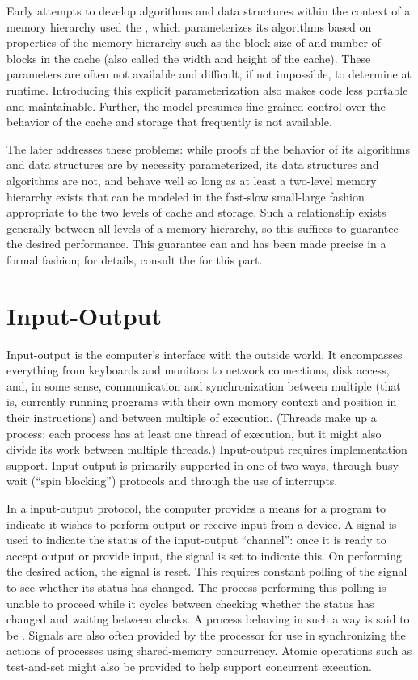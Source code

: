 Early attempts to develop algorithms and data structures within the context of a memory hierarchy used the , which parameterizes its algorithms based on properties of the memory hierarchy such as the block size of and number of blocks in the cache (also called the width and height of the cache). These parameters are often not available and difficult, if not impossible, to determine at runtime. Introducing this explicit parameterization also makes code less portable and maintainable. Further, the model presumes fine-grained control over the behavior of the cache and storage that frequently is not available.

The later  addresses these problems: while proofs of the behavior of its algorithms and data structures are by necessity parameterized, its data structures and algorithms are not, and behave well so long as at least a two-level memory hierarchy exists that can be modeled in the fast-slow small-large fashion appropriate to the two levels of cache and storage. Such a relationship exists generally between all levels of a memory hierarchy, so this suffices to guarantee the desired performance. This guarantee can and has been made precise in a formal fashion; for details, consult the  for this part.

\section{Input-Output}\label{background:computers:inputoutput}
Input-output is the computer's interface with the outside world. It encompasses everything from keyboards and monitors to network connections, disk access, and, in some sense, communication and synchronization between multiple  (that is, currently running programs with their own memory context and position in their instructions) and between multiple  of execution. (Threads make up a process: each process has at least one thread of execution, but it might also divide its work between multiple threads.) Input-output requires implementation support. Input-output is primarily supported in one of two ways, through busy-wait (``spin blocking'') protocols and through the use of interrupts.

In a  input-output protocol, the computer provides a means for a program to indicate it wishes to perform output or receive input from a device. A signal is used to indicate the status of the input-output ``channel'': once it is ready to accept output or provide input, the signal is set to indicate this. On performing the desired action, the signal is reset. This requires constant polling of the signal to see whether its status has changed. The process performing this polling is unable to proceed while it cycles between checking whether the status has changed and waiting between checks. A process behaving in such a way is said to be . Signals are also often provided by the processor for use in synchronizing the actions of processes using shared-memory concurrency. Atomic operations such as test-and-set might also be provided to help support concurrent execution.

